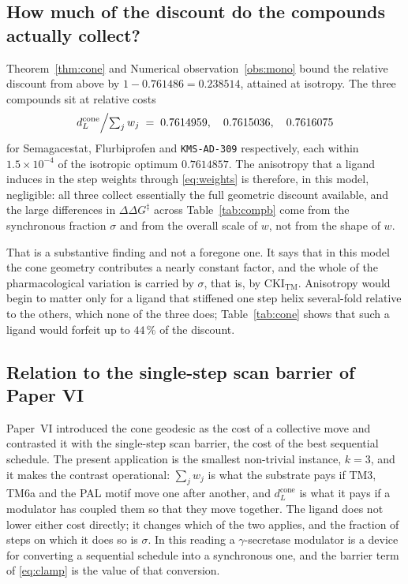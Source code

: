 \documentclass[11pt,reqno]{amsart}
\theoremstyle{plain}
\theoremstyle{definition}
\theoremstyle{remark}
\numberwithin{equation}{section}
\newcommand{\CKI}{\mathrm{CKI}}
\newcommand{\CKItm}{\CKI_{\mathrm{TM}}}
\newcommand{\dcone}{d_L^{\mathrm{cone}}}
\newcommand{\lead}{\texttt{KMS-AD-309}}
\begin{document}
\subsection{How much of the discount do the compounds actually collect?}
\label{sec:collect}
Theorem~\ref{thm:cone} and Numerical observation~\ref{obs:mono} bound the relative discount from above by $1-0.761486=0.238514$, attained at isotropy. The three compounds sit at relative costs
\[
\dcone\Bigl/\textstyle\sum_jw_j \;=\; 0.7614959,\quad 0.7615036,\quad 0.7616075
\]
for Semagacestat, Flurbiprofen and \lead{} respectively, each within $1.5\times10^{-4}$ of the isotropic optimum $0.7614857$. The anisotropy that a ligand induces in the step weights through \eqref{eq:weights} is therefore, in this model, negligible: all three collect essentially the full geometric discount available, and the large differences in $\Delta\Delta G^{\ddagger}$ across Table~\ref{tab:compb} come from the synchronous fraction $\sigma$ and from the overall scale of $w$, not from the shape of $w$.

That is a substantive finding and not a foregone one. It says that in this model the cone geometry contributes a nearly constant factor, and the whole of the pharmacological variation is carried by $\sigma$, that is, by $\CKItm$. Anisotropy would begin to matter only for a ligand that stiffened one step helix several-fold relative to the others, which none of the three does; Table~\ref{tab:cone} shows that such a ligand would forfeit up to $44\,\%$ of the discount.

\subsection{Relation to the single-step scan barrier of Paper VI}
Paper~VI introduced the cone geodesic as the cost of a collective move and contrasted it with the single-step scan barrier, the cost of the best sequential schedule. The present application is the smallest non-trivial instance, $k=3$, and it makes the contrast operational: $\sum_jw_j$ is what the substrate pays if TM3, TM6a and the PAL motif move one after another, and $\dcone$ is what it pays if a modulator has coupled them so that they move together. The ligand does not lower either cost directly; it changes which of the two applies, and the fraction of steps on which it does so is $\sigma$. In this reading a $\gamma$-secretase modulator is a device for converting a sequential schedule into a synchronous one, and the barrier term of \eqref{eq:clamp} is the value of that conversion.
\end{document}
